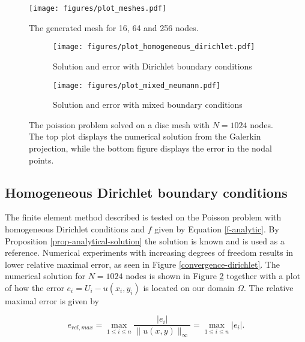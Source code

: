\documentclass[11pt,a4paper,english]{elsarticle}%
\begin{document}
\begin{figure}[b]
    \centering
        \texttt{[image: figures/plot\_meshes.pdf]}
    \caption{The generated mesh for  16, 64 and 256 nodes. }
    \label{plot-meshes}
\end{figure}

\begin{figure}[ht]
    \begin{subfigure}[b]{0.5\textwidth}
        \centering
            \texttt{[image: figures/plot\_homogeneous\_dirichlet.pdf]}
            \caption{Solution and error with Dirichlet boundary conditions}
        \label{solution-error-dirichlet}
    \end{subfigure}\qquad
    \begin{subfigure}[b]{0.5\textwidth}
        \centering
            \texttt{[image: figures/plot\_mixed\_neumann.pdf]}
            \caption{Solution and error with mixed boundary conditions}
        \label{solution-error-mixed}
    \end{subfigure}
    \label{fig-convergence}
    \caption{The poission problem solved on a disc mesh with $N = 1024$ nodes.
    The top plot displays the numerical solution from the Galerkin projection,
    while the bottom figure displays the error in the nodal points.}
\end{figure}
\subsection{Homogeneous Dirichlet boundary conditions}
The finite element method described is tested on the Poisson problem with homogeneous Dirichlet conditions and $f$ given by Equation \eqref{f-analytic}. 
By Proposition \ref{prop-analytical-solution} the solution is known and is used as a reference. 
Numerical experiments with increasing degrees of freedom results in lower relative maximal error, as seen in Figure \ref{convergence-dirichlet}. The numerical solution for $N = 1024$ nodes is shown in Figure \ref{solution-error-dirichlet}
together with a plot of how the error $e_{i} = U_{i} - u(x_i,y_i)$ is located on our domain $\Omega$. 
The relative maximal error is given by

\begin{equation*}
    e_{rel,max} = \max_{1\leq i \leq n} \frac{|e_i|}{\| u(x,y)\|_{\infty}} = \max_{1\leq i \leq n} |e_i|.
\end{equation*}
\end{document}
